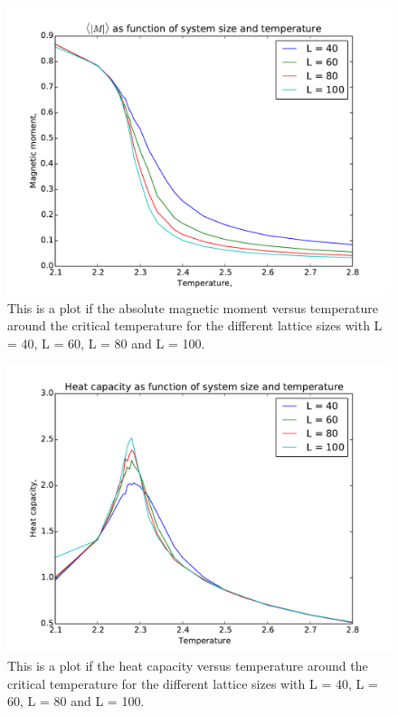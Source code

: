 \begin{figure}[H]
\includegraphics[width=\linewidth]{../results/4e/4e_mag}\caption{This is a plot if the absolute magnetic moment versus temperature around the critical temperature for the different lattice sizes with L = 40, L = 60, L = 80 and L = 100.}\label{fig:4e_magnetic}
\end{figure}

\begin{figure}[H]
\includegraphics[width=\linewidth]{../results/4e/4e_Cv}\caption{This is a plot if the heat capacity versus temperature around the critical temperature for the different lattice sizes with L = 40, L = 60, L = 80 and L = 100.}\label{fig:4e_heat_capa}
\end{figure}

